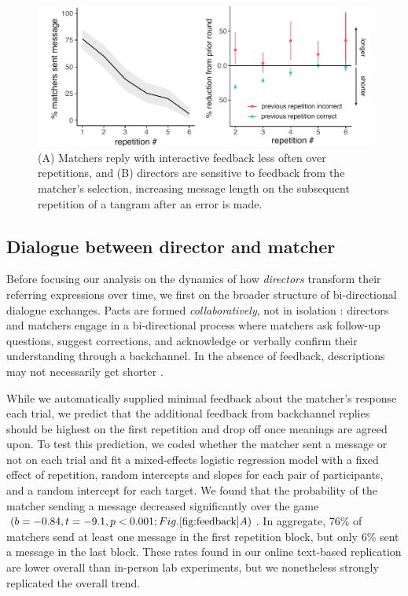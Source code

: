 \documentclass[alpha-refs]{wiley-article}
\begin{document}
\begin{figure}[t]
\centering
\includegraphics[scale=.85]{listenerFeedback_combined.pdf}
\caption{(A) Matchers reply with interactive feedback less often over repetitions, and (B) directors are sensitive to feedback from the matcher's selection, increasing message length on the subsequent repetition of a tangram after an error is made.}
\label{fig:feedback}
\end{figure}

\subsection{Dialogue between director and matcher}\label{listener-feedback}

Before focusing our analysis on the dynamics of how \emph{directors} transform their referring expressions over time, we first on the broader structure of bi-directional dialogue exchanges.
Pacts are formed \emph{collaboratively}, not in isolation \citep{ClarkWilkesGibbs86_ReferringCollaborative}: 
directors and matchers engage in a bi-directional process where matchers ask follow-up questions, suggest corrections, and acknowledge or verbally confirm their understanding through a backchannel. 
In the absence of feedback, descriptions may not necessarily get shorter \citep{KraussWeinheimer66_Tangrams, GarrodFayLeeOberlanderMacLeod07_GraphicalSymbolSystems}.

While we automatically supplied minimal feedback about the matcher's response each trial, we predict that the additional feedback from backchannel replies should be highest on the first repetition and drop off once meanings are agreed upon. 
To test this prediction, we coded whether the matcher sent a message or not on each trial and fit a mixed-effects logistic regression model with a fixed effect of repetition, random intercepts and slopes for each pair of participants, and a random intercept for each target. 
We found that the probability of the matcher sending a message decreased significantly over the game $(b=-0.84, t = -9.1, p < 0.001; Fig. \ref{fig:feedback}A)$.
In aggregate, 76\% of matchers send at least one message in the first repetition block, but only 6\% sent a message in the last block.
These rates found in our online text-based replication are lower overall than in-person lab experiments, but we nonetheless strongly replicated the overall trend.
\end{document}
